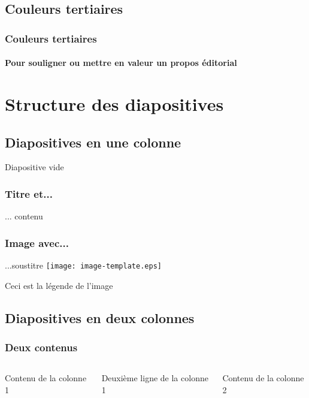 \documentclass[aspectratio=1610,compress,t,gabarita,english,french]{hecppt}
\begin{document}
\subsection{Couleurs tertiaires}

\begin{frame}[c]
	\frametitle{Couleurs tertiaires}
	\framesubtitle{Pour souligner ou mettre en valeur un propos éditorial}
	\begin{list}{}{}
		\item {}
		\item {}
		\item {}
		\item {}
		\item {}
		\item {}
	\end{list}
\end{frame}

\section{Structure des diapositives}
\hypertarget{structureDiapos}{}

\subsection{Diapositives en une colonne}

\begin{frame}
	Diapositive vide
\end{frame}

\begin{frame}
	\frametitle{Titre et...}
	... contenu
\end{frame}

\begin{frame}
	\frametitle{Image avec...}
	\begin{HECimagesstitre}{...soustitre}	
		\texttt{[image: image-template.eps]}
		\caption{Ceci est la légende de l'image}
	\end{HECimagesstitre}
\end{frame}

\subsection{Diapositives en deux colonnes}

\begin{frame}
	\frametitle{Deux contenus}
	\begin{columns}
			Contenu de la colonne 1
			
			Deuxième ligne de la colonne 1
			
			Contenu de la colonne 2
	\end{columns}
\end{frame}
\end{document}
